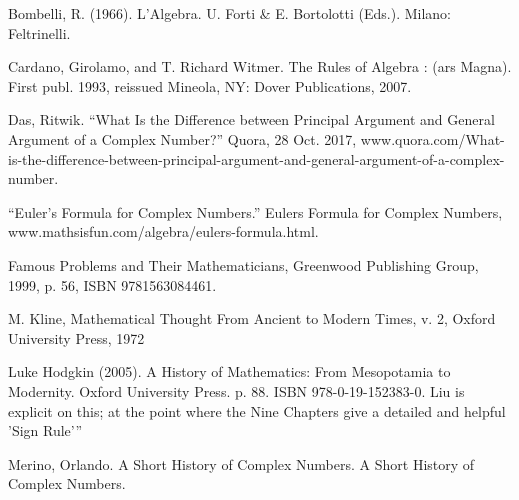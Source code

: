 \documentclass[12pt]{article}
\begin{document}
\begin{thebibliography}{9}
Bombelli, R. (1966). L’Algebra. U. Forti & E. Bortolotti (Eds.). Milano: Feltrinelli.

Cardano, Girolamo, and T. Richard Witmer. The Rules of Algebra : (ars Magna). First publ. 1993, reissued Mineola, NY: Dover Publications, 2007.

Das, Ritwik. “What Is the Difference between Principal Argument and General Argument of a Complex Number?” Quora, 28 Oct. 2017, www.quora.com/What-is-the-difference-between-principal-argument-and-general-argument-of-a-complex-number.

“Euler's Formula for Complex Numbers.” Eulers Formula for Complex Numbers, www.mathsisfun.com/algebra/eulers-formula.html.

 Famous Problems and Their Mathematicians, Greenwood Publishing Group, 1999, p. 56, ISBN 9781563084461.
 
M. Kline, Mathematical Thought From Ancient to Modern Times, v. 2, Oxford University Press, 1972

Luke Hodgkin (2005). A History of Mathematics: From Mesopotamia to Modernity. Oxford University Press. p. 88. ISBN 978-0-19-152383-0. Liu is explicit on this; at the point where the Nine Chapters give a detailed and helpful 'Sign Rule'”

Merino, Orlando. A Short History of Complex Numbers. A Short History of Complex Numbers.

\end{thebibliography}
 
\end{document}
